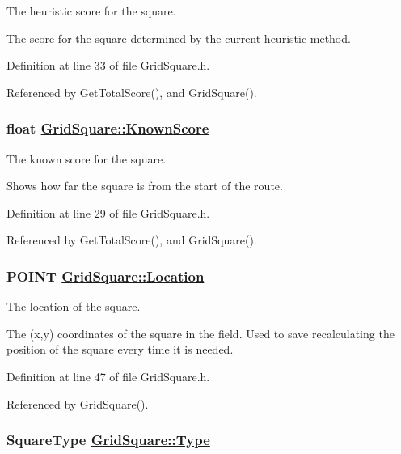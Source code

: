 The heuristic score for the square. 

The score for the square determined by the current heuristic method. 

Definition at line 33 of file Grid\-Square.h.

Referenced by Get\-Total\-Score(), and Grid\-Square().\hypertarget{class_grid_square_c9bf6cff92f3931e306e94c8fd0711a0}{
\subsubsection[KnownScore]{\setlength{\rightskip}{0pt plus 5cm}float \hyperlink{class_grid_square_c9bf6cff92f3931e306e94c8fd0711a0}{Grid\-Square::Known\-Score}}}
\label{class_grid_square_c9bf6cff92f3931e306e94c8fd0711a0}


The known score for the square. 

Shows how far the square is from the start of the route. 

Definition at line 29 of file Grid\-Square.h.

Referenced by Get\-Total\-Score(), and Grid\-Square().\hypertarget{class_grid_square_fc056ec707b8419556574e4ea9244a48}{
\subsubsection[Location]{\setlength{\rightskip}{0pt plus 5cm}POINT \hyperlink{class_grid_square_fc056ec707b8419556574e4ea9244a48}{Grid\-Square::Location}}}
\label{class_grid_square_fc056ec707b8419556574e4ea9244a48}


The location of the square. 

The (x,y) coordinates of the square in the field. Used to save recalculating the position of the square every time it is needed. 

Definition at line 47 of file Grid\-Square.h.

Referenced by Grid\-Square().\hypertarget{class_grid_square_c6541480f1e2b8a281aae84b357b8024}{
\subsubsection[Type]{\setlength{\rightskip}{0pt plus 5cm}Square\-Type \hyperlink{class_grid_square_c6541480f1e2b8a281aae84b357b8024}{Grid\-Square::Type}}}
\label{class_grid_square_c6541480f1e2b8a281aae84b357b8024}


